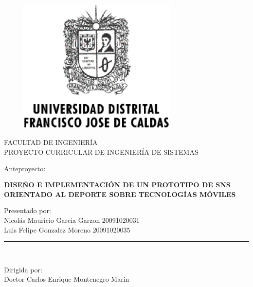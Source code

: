 \documentclass[letter,12pt]{book}
\begin{document}
  \begin{titlepage}

    \begin{center}
      \vspace*{-1in}
      \begin{figure}[htb]
    \begin{center}
      \includegraphics[width=8cm]{imagenes/Logo_Distrital.eps}
    \end{center}
    \end{figure}

    FACULTAD DE INGENIERÍA\\
    \vspace*{0.15in}
    PROYECTO CURRICULAR DE INGENIERÍA DE SISTEMAS \\
    \vspace*{0.6in}
    \begin{large}
    Anteproyecto:\\
    \end{large}
    \vspace*{0.2in}
    \begin{Large}
    \textbf{DISEÑO E IMPLEMENTACIÓN DE UN PROTOTIPO DE SNS ORIENTADO AL DEPORTE SOBRE TECNOLOGÍAS MÓVILES} \\ 
    \end{Large}
    \vspace*{0.3in}
    \begin{large}
    Presentado por:\\
      Nicolás Mauricio Garcia Garzon 20091020031 \\
      Luis Felipe Gonzalez Moreno 20091020035
    \end{large}
    \vspace*{0.3in}
    \rule{80mm}{0.1mm}\\
    \vspace*{0.1in}
    \begin{large}
    Dirigida por: \\
    Doctor Carlos Enrique Montenegro Marin
    \end{large}
    \end{center}

    \end{titlepage}
\end{document}
